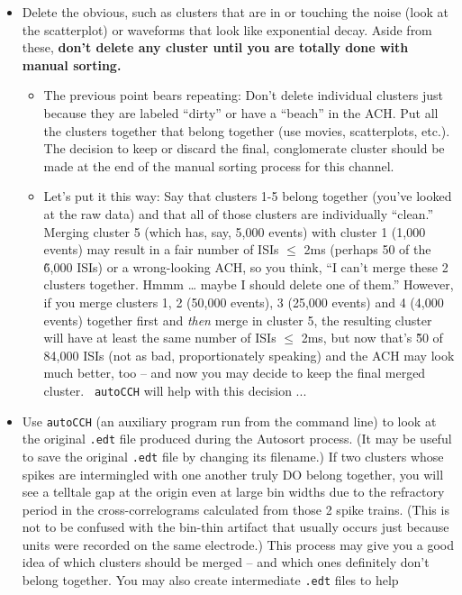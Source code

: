 \documentclass[12pt]{article}
\begin{document}
\begin{itemize}
\item Delete the obvious, such as clusters that are in or touching
    the noise (look at the scatterplot) or waveforms that look like
    exponential decay. Aside from these, \textbf{don't delete any
      cluster until you are totally done with manual sorting.}
\begin{itemize}
\item The previous point bears repeating: Don't delete individual
  clusters just because they are labeled ``dirty'' or have a ``beach''
  in the ACH. Put all the clusters together that belong together (use
  movies, scatterplots, etc.). The decision to keep or discard the
  final, conglomerate cluster should be made at the end of the manual
  sorting process for this channel.
\item Let's put it this way: Say that clusters 1-5 belong together
  (you've looked at the raw data) and that all of those clusters are
  individually ``clean.'' Merging cluster 5 (which has, say, 5,000
  events) with cluster 1 (1,000 events) may result in a fair number of
  ISIs ${\leq}$ 2ms (perhaps 50 of the \~6,000 ISIs) or a
  wrong-looking ACH, so you think, ``I can't merge these 2 clusters
  together. Hmmm {\dots} maybe I should delete one of them.'' However,
  if you merge clusters 1, 2 (50,000 events), 3 (25,000 events) and 4
  (4,000 events) together first and \textit{then} merge in cluster 5,
  the resulting cluster will have at least the same number of ISIs
  ${\leq}$ 2ms, but now that's \~50 of 84,000 ISIs (not as bad,
  proportionately speaking) and the ACH may look much better, too --
  and now you may decide to keep the final merged cluster. {\tt
    autoCCH} will help with this decision ...
\end{itemize}
\item Use \texttt{autoCCH} (an auxiliary program run from the command
  line) to look at the original {\tt .edt} file produced during the
  Autosort process. (It may be useful to save the original {\tt .edt}
  file by changing its filename.) If two clusters whose spikes are
  intermingled with one another truly DO belong together, you will see
  a telltale gap at the origin even at large bin widths due to the
  refractory period in the cross-correlograms calculated from those 2
  spike trains. (This is not to be confused with the bin-thin artifact
  that usually occurs just because units were recorded on the same
  electrode.) This process may give you a good idea of which clusters
  should be merged -- and which ones definitely don't belong
  together. You may also create intermediate {\tt .edt} files to help

\end{itemize}
\end{document}
